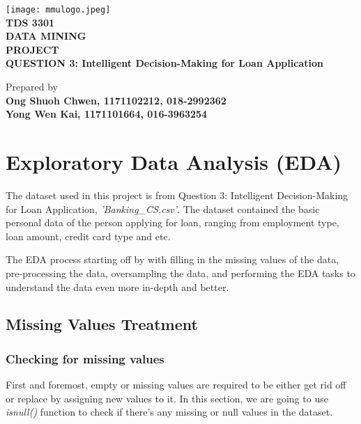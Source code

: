 \documentclass[11pt]{article}
\begin{document}
\begin{center}

\texttt{[image: mmulogo.jpeg]}\\
\vspace{0.5cm}
\Large{\textbf{TDS 3301 \\DATA MINING}} \\
\vspace{1.5cm}
\Large{\textbf{PROJECT}} \\
\vspace{1cm}
\large{\textbf{QUESTION 3: Intelligent Decision-Making for Loan Application}}
\vspace{1cm}
 


\vspace{5cm}


\normalsize{Prepared by} \\
\vspace{1cm}
\large{\textbf{Ong Shuoh Chwen, 1171102212, 018-2992362}} \\ 
\large{\textbf{Yong Wen Kai, 1171101664, 016-3963254}} \\ 
 

\end{center}

\thispagestyle{empty}
\clearpage 
\setcounter{page}{0}
\tableofcontents

\clearpage
{}
\setcounter{page}{1}
\section{Exploratory Data Analysis (EDA)}
The dataset used in this project is from Question 3: Intelligent Decision-Making for Loan Application, \textit{'Banking\_CS.csv'}. The dataset contained the basic personal data of the person applying for loan, ranging from employment type, loan amount, credit card type and etc.

The EDA process starting off by with filling in the missing values of the data, pre-processing the data, oversampling the data, and performing the EDA tasks to understand the data even more in-depth and better.

\subsection{Missing Values Treatment}
\subsubsection{Checking for missing values}
First and foremost, empty or missing values are required to be either get rid off or replace by assigning new values to it. In this section, we are going to use \textit{isnull()} function to check if there's any missing or null values in the dataset. 
\end{document}
